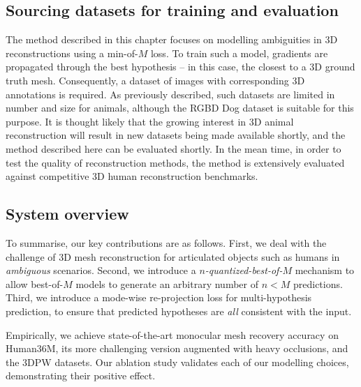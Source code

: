 

\subsection{Sourcing datasets for training and evaluation}

The method described in this chapter focuses on modelling ambiguities in 3D reconstructions using a min-of-$M$ loss. To train such a model, gradients are propagated through the best hypothesis -- in this case, the closest to a 3D ground truth mesh. Consequently, a dataset of images with corresponding 3D annotations is required. As previously described, such datasets are limited in number and size for animals, although the RGBD Dog dataset is suitable for this purpose. It is thought likely that the growing interest in 3D animal reconstruction will result in new datasets being made available shortly, and the method described here can be evaluated shortly. In the mean time, in order to test the quality of reconstruction methods, the method is extensively evaluated against competitive 3D human reconstruction benchmarks.

\subsection{System overview}
To summarise, our key contributions are as follows.
First, we deal with the challenge of 3D mesh reconstruction for articulated objects such as humans in \emph{ambiguous} scenarios.
Second, we introduce a \emph{$n$-quantized-best-of-$M$} mechanism to allow best-of-$M$ models to generate an arbitrary number of $n<M$ predictions.
Third, we introduce a mode-wise re-projection loss for multi-hypothesis prediction, to ensure that predicted hypotheses are \emph{all} consistent with the input.

Empirically, we achieve state-of-the-art monocular mesh recovery accuracy on Human36M, its more challenging version augmented with heavy occlusions, and the 3DPW datasets.
Our ablation study validates each of our modelling choices, demonstrating their positive effect.

